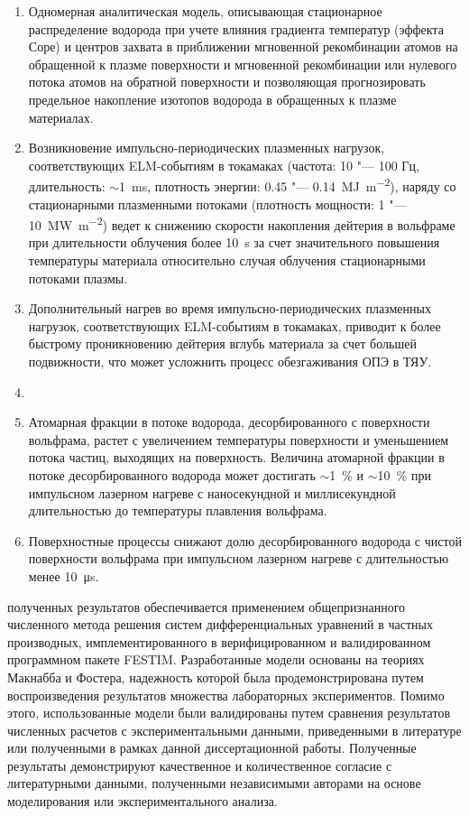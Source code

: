 {}
\begin{enumerate}[beginpenalty=10000] %
    \item Одномерная аналитическая модель, описывающая стационарное распределение водорода при учете влияния градиента температур (эффекта Соре) и центров захвата в приближении мгновенной рекомбинации атомов на обращенной к плазме поверхности и мгновенной рекомбинации или нулевого потока атомов на обратной поверхности и позволяющая прогнозировать предельное накопление изотопов водорода в обращенных к плазме материалах.
    \item Возникновение импульсно-периодических плазменных нагрузок, соответствующих ELM-событиям в токамаках (частота: 10 "--- 100 Гц, длительность: $\sim$\SI{1}{\milli\second}, плотность энергии: 0.45 "--- \SI{0.14}{\mega\joule\per\meter\squared}), наряду со стационарными плазменными потоками (плотность мощности: 1 "--- \SI{10}{\mega\watt\per\meter\squared}) ведет к снижению скорости накопления дейтерия в вольфраме при длительности облучения более \SI{10}{\second} за счет значительного повышения температуры материала относительно случая облучения стационарными потоками плазмы. 
    \item Дополнительный нагрев во время импульсно-периодических плазменных нагрузок, соответствующих ELM-событиям в токамаках, приводит к более быстрому проникновению дейтерия вглубь материала за счет большей подвижности, что может усложнить процесс обезгаживания ОПЭ в ТЯУ. 
    \item {}
    \item Атомарная фракции в потоке водорода, десорбированного с поверхности вольфрама, растет с увеличением температуры поверхности и уменьшением потока частиц, выходящих на поверхность. Величина атомарной фракции в потоке десорбированного водорода может достигать $\sim$1~\% и $\sim$10~\% при импульсном лазерном нагреве с наносекундной и миллисекундной длительностью до температуры плавления вольфрама.
    \item Поверхностные процессы снижают долю десорбированного водорода с чистой поверхности вольфрама при импульсном лазерном нагреве с длительностью менее \SI{10}{\micro\second}.
\end{enumerate}

{\reliability} полученных результатов обеспечивается применением общепризнанного численного метода решения систем дифференциальных уравнений в частных производных, имплементированного в верифицированном и валидированном программном пакете FESTIM. Разработанные модели основаны на теориях Макнабба и Фостера, надежность которой была продемонстрирована путем воспроизведения результатов множества лабораторных экспериментов. Помимо этого, использованные модели были валидированы путем сравнения результатов численных расчетов с экспериментальными данными, приведенными в литературе или полученными в рамках данной диссертационной работы. Полученные результаты демонстрируют качественное и количественное согласие с литературными данными, полученными независимыми авторами на основе моделирования или экспериментального анализа.

